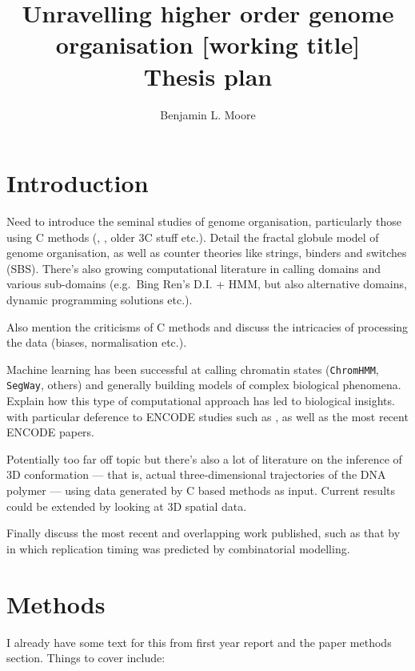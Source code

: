 \documentclass[a4paper,10pt,oneside]{book}
\title{ \vspace{3in} Unravelling higher order genome organisation {\small [working
    title]} \\ \vspace{2em} {\large {\bf Thesis plan}} }
\author{Benjamin L. Moore}
\begin{document}
\maketitle

\chapter{Introduction}

Need to introduce the seminal studies of genome organisation,
particularly those using C methods (\citet{Lieberman2011},
\citet{Dixon2012}, older 3C stuff\citep{VanSteensel2010} etc.). Detail
the fractal globule\citep{Lieberman2011} model of genome organisation,
as well as counter theories like strings, binders and switches
(SBS)\citep{Barbieri2012}. There's also growing computational literature
in calling domains and various sub-domains (e.g.~Bing Ren's D.I. +
HMM\citep{Dixon2012}, but also alternative domains\citep{Filippova2014},
dynamic programming solutions\citep{Levy-Leduc2014} etc.).

Also mention the criticisms of C
methods\cite{Gavrilov2013, Gavrilov2013a} and discuss the intricacies of
processing the data (biases,\citep{Yaffe2011}
normalisation\citep{Imakaev2012, Hu2012, Hu2013} etc.).

Machine learning has been successful at calling chromatin states
(\texttt{ChromHMM}, \texttt{SegWay}, others) and generally building
models of complex biological phenomena. Explain how this type of
computational approach has led to biological insights. with particular
deference to ENCODE studies such as \citet{Dong2012}, as well as the
most recent ENCODE papers.

Potentially too far off topic but there's also a lot of literature on
the inference of 3D
conformation\cite{Varoquaux2014a, Ay2014b, Dekker2013, Bau2011a, Hu2013a}
--- that is, actual three-dimensional trajectories of the DNA polymer
--- using data generated by C based methods as input. Current results
could be extended by looking at 3D spatial data.

Finally discuss the most recent and overlapping work published, such as
that by \citet{Comoglio2014} in which replication timing was predicted
by combinatorial modelling.

\chapter{Methods}

I already have some text for this from first year report and the paper
methods section. Things to cover include:
\end{document}
